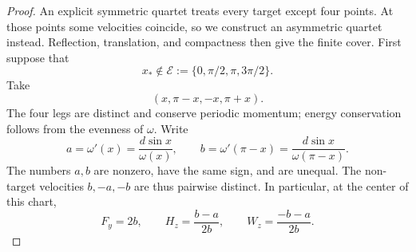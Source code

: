 \begin{proof}
An explicit symmetric quartet treats every target except four points.
At those points some velocities coincide, so we construct an asymmetric
quartet instead. Reflection, translation, and compactness then give
the finite cover. First suppose that
\[
                  x_*\notin\mathcal E
                  :=\{0,\pi/2,\pi,3\pi/2\}.
\]
Take
\begin{equation}
                       (x,\pi-x,-x,\pi+x).
 \label{pin:symmetric-quartet}
\end{equation}
The four legs are distinct and conserve periodic momentum; energy
conservation follows from the evenness of $\omega$. Write
\begin{equation}
 a=\omega'(x)=\frac{d\sin x}{\omega(x)},\qquad
 b=\omega'(\pi-x)=\frac{d\sin x}{\omega(\pi-x)}.
 \label{pin:ab}
\end{equation}
The numbers $a,b$ are nonzero, have the same sign, and are unequal.
The non-target velocities $b,-a,-b$ are thus pairwise distinct.
In particular, at the center of this chart,
\begin{equation}
                   F_y=2b,\qquad
                   H_z=\frac{b-a}{2b},\qquad W_z=\frac{-b-a}{2b}.
 \label{pin:symmetric-derivatives}
\end{equation}


\end{proof}

